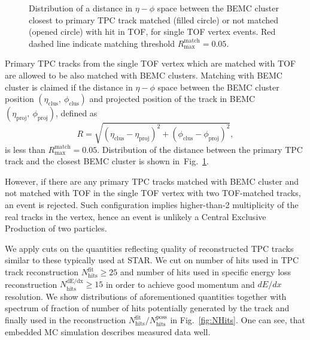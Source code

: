 \begin{figure}[t!]
\begin{minipage}{.4725\textwidth}
  \caption[Distribution of a distance in $\eta-\phi$ space between the BEMC cluster closest to primary TPC track ($R_{\text{min}}$)]{Distribution of a distance in $\eta-\phi$ space between the BEMC cluster closest to primary TPC track matched (filled circle) or not matched (opened circle) with hit in TOF, for single TOF vertex events. Red dashed line indicate matching threshold $R^{\text{match}}_{\text{max}} = 0.05$.\newline\newline}\label{fig:Rmin} %
\end{minipage}%
\end{figure}%

Primary TPC tracks from the single TOF vertex which are matched with TOF are allowed to be also matched with BEMC clusters. Matching with BEMC cluster is claimed if the distance in $\eta-\phi$ space between the BEMC cluster position $(\eta_{\text{clus}},~\phi_{\text{clus}})$ and projected position of the track in BEMC $(\eta_{\text{proj}},~\phi_{\text{proj}})$, defined as
\begin{equation}\label{eq:etaPhiR}
 R=\sqrt{(\eta_{\text{clus}}-\eta_{\text{proj}})^{2} + (\phi_{\text{clus}}-\phi_{\text{proj}})^{2}},
\end{equation}
is less than $R^{\text{match}}_{\text{max}} = 0.05$. Distribution of the distance between the primary TPC track and the closest BEMC cluster is shown in~Fig.~\ref{fig:Rmin}.

However, if there are any primary TPC tracks matched with BEMC cluster and not matched with TOF in the single TOF vertex with two TOF-matched tracks, an event is rejected. Such configuration implies higher-than-2 multiplicity of the real tracks in the vertex, hence an event is unlikely a Central Exclusive Production of two particles.

We apply cuts on the quantities reflecting quality of reconstructed TPC tracks similar to these typically used at STAR. We cut on number of hits used in TPC track reconstruction $N_{\text{hits}}^{\text{fit}} \geq 25$ and number of hits used in specific energy loss reconstruction $N_{\text{hits}}^{\text{dE/dx}} \geq 15$ in order to achieve good momentum and $dE/dx$ resolution. We show distributions of aforementioned quantities together with spectrum of fraction of number of hits potentially generated by the track and finally used in the reconstruction $N_{\text{hits}}^{\text{fit}}/N_{\text{hits}}^{\text{poss}}$ in Fig.~\ref{fig:NHits}. One can see, that embedded MC simulation describes measured data well.


